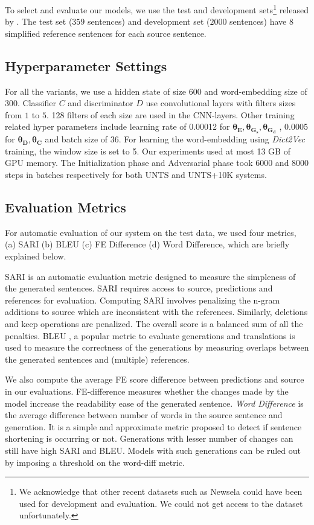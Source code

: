 \documentclass[11pt,a4paper]{article}
\begin{document}
To select and evaluate our models, we use the test and development sets\footnote{We acknowledge that other recent datasets such as Newsela could have been used for development and evaluation. We could not get access to the dataset unfortunately.} released by \cite{xu2016optimizing}. The test set ($359$ sentences) and development set ($2000$ sentences) have 8 simplified reference sentences for each source sentence. 

\subsection{Hyperparameter Settings}
\label{subsec:param}
For all the variants, we use a hidden state of size 600 and word-embedding size of 300. Classifier $C$ and discriminator $D$ use convolutional layers with filters sizes from $1$ to $5$. 128 filters of each size are used in the CNN-layers. Other training related hyper parameters include learning rate of 0.00012 for $\boldsymbol{\theta_E,\theta_{G_s},\theta_{G_d}}$ , 0.0005 for $\boldsymbol{\theta_D,\theta_C}$ and batch size of 36. For learning the word-embedding using \textit{Dict2Vec} training, the window size is set to 5. Our experiments used at most 13 GB of GPU memory. The Initialization phase and Adversarial phase took 6000 and 8000 steps in batches respectively for both \textsc{UNTS} and \textsc{UNTS}+10K systems.

\subsection{Evaluation Metrics}
For automatic evaluation of our system on the test data, we used four metrics, (a) SARI (b)  BLEU (c) FE Difference (d) Word Difference, which are briefly explained below.

SARI \cite{xu2016optimizing} is an automatic evaluation metric designed to measure the simpleness of the generated sentences. SARI requires access to source, predictions and references for evaluation. Computing SARI involves penalizing the n-gram additions to source which are inconsistent with the references. Similarly, deletions and keep operations are penalized. The overall score is a balanced sum of all the penalties. BLEU \cite{papineni2002bleu}, a popular metric to evaluate generations and translations is used to measure the correctness of the generations by measuring overlaps between the generated sentences and (multiple) references.

We also compute the average FE score difference between predictions and source in our evaluations. FE-difference measures whether the changes made by the model increase the readability ease of the generated sentence. \textit{Word Difference} is the average difference between number of words in the source sentence and generation. It is a simple and approximate metric proposed to detect if sentence shortening is occurring or not. Generations with lesser number of changes can still have high SARI and BLEU. Models with such generations can be ruled out by imposing a threshold on the word-diff metric.
\end{document}
